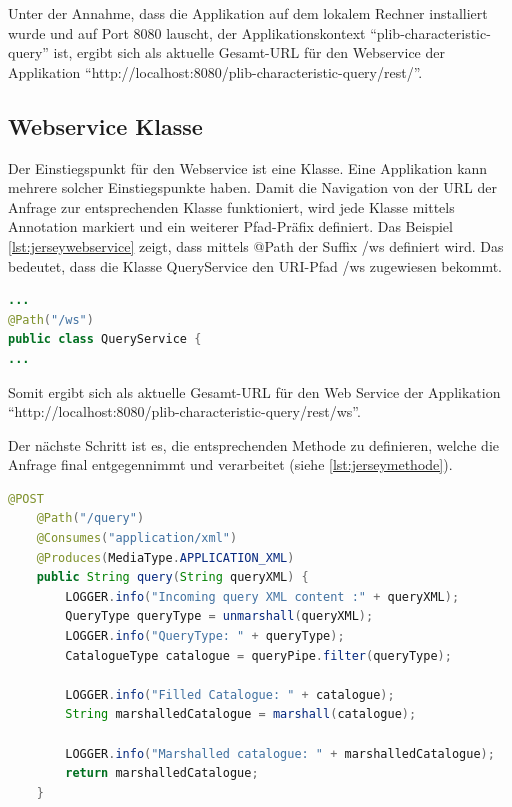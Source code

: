Unter der Annahme, dass die Applikation auf dem lokalem Rechner installiert wurde und auf Port 8080 lauscht, der Applikationskontext \enquote{plib-characteristic-query} ist, ergibt sich als aktuelle Gesamt-URL für den \gls{Webservice} der Applikation \enquote{http://localhost:8080/plib-characteristic-query/rest/}.
 

\subsection{Webservice Klasse}
Der Einstiegspunkt für den \gls{Webservice} ist eine Klasse. Eine Applikation kann mehrere solcher Einstiegspunkte haben. Damit die Navigation von der \gls{URL} der Anfrage zur entsprechenden Klasse funktioniert, wird jede Klasse mittels Annotation markiert und ein weiterer Pfad-Präfix definiert. Das Beispiel 
\autoref{lst:jerseywebservice} zeigt, dass mittels @Path der Suffix /ws definiert wird. Das bedeutet, dass die Klasse QueryService den \gls{URI}-Pfad /ws zugewiesen bekommt. 
  \begin{lstlisting}[caption=Jersey Webservice Klasse, language=Java, label=lst:jerseywebservice]
...
@Path("/ws")
public class QueryService {
...
 \end{lstlisting}  
 
Somit ergibt sich als aktuelle Gesamt-\gls{URL} für den Web Service der Applikation \\  \enquote{http://localhost:8080/plib-characteristic-query/rest/ws}.
 
Der nächste Schritt ist es, die entsprechenden Methode zu definieren, welche die Anfrage final entgegennimmt und verarbeitet (siehe \autoref{lst:jerseymethode}). 
 
  \begin{lstlisting}[caption=Jersey Methode, language=Java, label=lst:jerseymethode]
    @POST
    @Path("/query")
    @Consumes("application/xml")
    @Produces(MediaType.APPLICATION_XML)
    public String query(String queryXML) {
        LOGGER.info("Incoming query XML content :" + queryXML);
        QueryType queryType = unmarshall(queryXML);
        LOGGER.info("QueryType: " + queryType);
        CatalogueType catalogue = queryPipe.filter(queryType);

        LOGGER.info("Filled Catalogue: " + catalogue);
        String marshalledCatalogue = marshall(catalogue);

        LOGGER.info("Marshalled catalogue: " + marshalledCatalogue);
        return marshalledCatalogue;
    }
 \end{lstlisting}  

